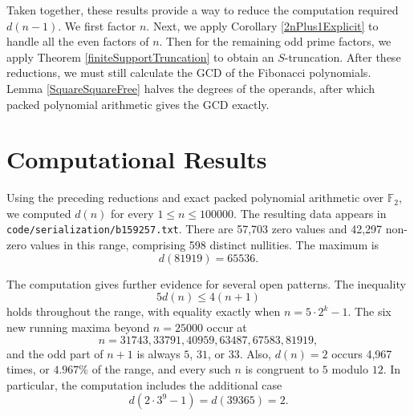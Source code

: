 \documentclass[a4paper]{article}
\newcommand{\F}{\mathbb{F}}
\begin{document}

	Taken together, these results provide a way to reduce the computation required $d(n-1)$.
	We first factor $n$.
	Next, we apply Corollary \ref{2nPlus1Explicit} to handle all the even factors of $n$.
	Then for the remaining odd prime factors, we apply Theorem \ref{finiteSupportTruncation} to obtain an $S$-truncation.
	After these reductions, we must still calculate the GCD of the Fibonacci polynomials.
	Lemma \ref{SquareSquareFree} halves the degrees of the operands, after which packed polynomial arithmetic gives the GCD exactly.
	
	
	\newpage
	\appendix
	\section{Computational Results}
	Using the preceding reductions and exact packed polynomial arithmetic over $\F_2$, we computed $d(n)$ for every $1 \leq n \leq 100000$.
	The resulting data appears in \texttt{code/serialization/b159257.txt}.
	There are 57,703 zero values and 42,297 non-zero values in this range, comprising 598 distinct nullities.
	The maximum is
	\begin{equation*}
		d(81919)=65536.
	\end{equation*}

	The computation gives further evidence for several open patterns.
	The inequality
	\begin{equation*}
		5d(n) \leq 4(n+1)
	\end{equation*}
	holds throughout the range, with equality exactly when $n=5\cdot2^k-1$.
	The six new running maxima beyond $n=25000$ occur at
	\begin{equation*}
		n=31743, 33791, 40959, 63487, 67583, 81919,
	\end{equation*}
	and the odd part of $n+1$ is always $5$, $31$, or $33$.
	Also, $d(n)=2$ occurs 4,967 times, or $4.967\%$ of the range, and every such $n$ is congruent to $5$ modulo $12$.
	In particular, the computation includes the additional case
	\begin{equation*}
		d(2\cdot3^9-1)=d(39365)=2.
	\end{equation*}
\end{document}
